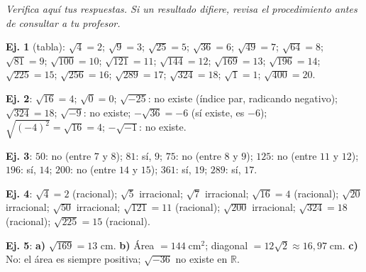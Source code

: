 \documentclass[11pt, letterpaper]{article}
\begin{document}
\clearpage
\begin{tcolorbox}[answerbox, title={Solucionario}]
{\small\textit{Verifica aquí tus respuestas. Si un resultado difiere, revisa el procedimiento antes de consultar a tu profesor.}}
\end{tcolorbox}

\medskip

\begin{tcolorbox}[answerbox, title={Bloque A — Raíz cuadrada y cuadrados perfectos}]

\noindent\textbf{Ej. 1} (tabla): $\sqrt{4}=2$; $\sqrt{9}=3$; $\sqrt{25}=5$; $\sqrt{36}=6$; $\sqrt{49}=7$; $\sqrt{64}=8$; $\sqrt{81}=9$; $\sqrt{100}=10$; $\sqrt{121}=11$; $\sqrt{144}=12$; $\sqrt{169}=13$; $\sqrt{196}=14$; $\sqrt{225}=15$; $\sqrt{256}=16$; $\sqrt{289}=17$; $\sqrt{324}=18$; $\sqrt{1}=1$; $\sqrt{400}=20$.

\medskip

\noindent\textbf{Ej. 2}: $\sqrt{16}=4$; $\sqrt{0}=0$; $\sqrt{-25}$: no existe (índice par, radicando negativo); $\sqrt{324}=18$; $\sqrt{-9}$: no existe; $-\sqrt{36}=-6$ (sí existe, es $-6$); $\sqrt{(-4)^2}=\sqrt{16}=4$; $-\sqrt{-1}$: no existe.

\medskip

\noindent\textbf{Ej. 3}: $50$: no (entre $7$ y $8$); $81$: sí, $9$; $75$: no (entre $8$ y $9$); $125$: no (entre $11$ y $12$); $196$: sí, $14$; $200$: no (entre $14$ y $15$); $361$: sí, $19$; $289$: sí, $17$.

\medskip

\noindent\textbf{Ej. 4}: $\sqrt{4}=2$ (racional); $\sqrt{5}$ irracional; $\sqrt{7}$ irracional; $\sqrt{16}=4$ (racional); $\sqrt{20}$ irracional; $\sqrt{50}$ irracional; $\sqrt{121}=11$ (racional); $\sqrt{200}$ irracional; $\sqrt{324}=18$ (racional); $\sqrt{225}=15$ (racional).

\medskip

\noindent\textbf{Ej. 5}: \textbf{a)} $\sqrt{169}=13$ cm. \quad \textbf{b)} Área $=144\;\text{cm}^2$; diagonal $=12\sqrt{2}\approx16{,}97\;\text{cm}$. \quad \textbf{c)} No: el área es siempre positiva; $\sqrt{-36}$ no existe en $\mathbb{R}$.
\end{tcolorbox}

\medskip
\end{document}
